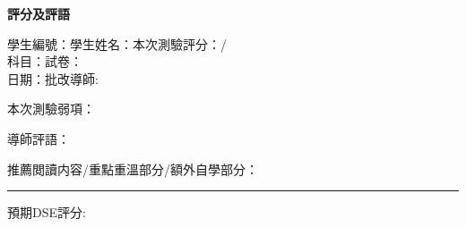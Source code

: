 \documentclass[12pt]{article}
\begin{document}
    \begin{center}
        \textbf{評分及評語}
    \end{center}

    \noindent 學生編號：\hrulefill 學生姓名：\hrulefill \hfill 本次測驗評分：\hrulefill/\hrulefill\\
    科目：\hrulefill\hfill 試卷：\hrulefill\\
    日期：\hrulefill\hfill 批改導師:\hrulefill

    \noindent 本次測驗弱項：
    \vspace{5cm}

    \noindent 導師評語：

    \hrulefill

    \hrulefill

    \hrulefill

    \hrulefill

    \hrulefill

    \hrulefill

    \hrulefill

    \hrulefill

    \hrulefill

    \noindent 推薦閲讀内容/重點重溫部分/額外自學部分：
    \vspace{5cm}
    
    \hrule

    \noindent 預期DSE評分:
\end{document}
